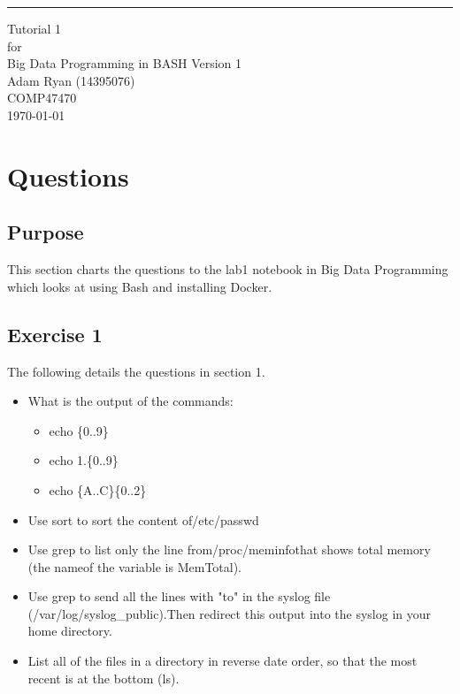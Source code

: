 \documentclass{scrreprt}
\date{}
\def\myversion{1 }
\begin{document}
\begin{flushright}
    \rule{16cm}{5pt}\vskip1cm
    \begin{bfseries}
        \Huge{Tutorial 1\\}
        \vspace{1.9cm}
        for\\
        \vspace{1.9cm}
        Big Data Programming in BASH
        \vspace{1.9cm}
        \LARGE{Version \myversion}\\
        \vspace{1.9cm}
        Adam Ryan (14395076)\\
        \vspace{1.9cm}
        COMP47470\\
        \vspace{1.9cm}
        \today\\
    \end{bfseries}
\end{flushright}

\tableofcontents

\chapter{Questions}\label{Intro}

\section{Purpose}\label{Purpose}
This section charts the questions to the lab1 notebook in Big Data Programming which looks at using Bash and installing Docker.

\section{Exercise 1}\label{Overview}
The following details the questions in section 1.
\begin{itemize}
	\item What is the output of the commands:
	\begin{itemize}
		\item echo \{0..9\}
		\item echo 1.\{0..9\}
		\item echo \{A..C\}\{0..2\}
	\end{itemize}
	\item Use sort to sort the content of/etc/passwd
	\item Use grep to list only the line from/proc/meminfothat shows total memory (the nameof the variable is MemTotal).
	\item Use grep to send all the lines with "to" in the syslog file (/var/log/syslog\_public).Then redirect this output into the syslog in your home directory.
	\item List all of the files in a directory in reverse date order, so that the most recent is at the bottom (ls).
\end{itemize}
\end{document}

